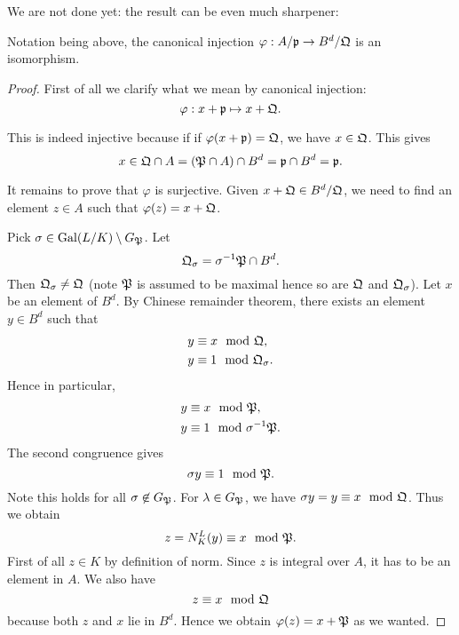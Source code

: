 				We are not done yet: the result can be even much sharpener:
				
				\begin{theorem}
					Notation being above, the canonical injection $\varphi:A/\mathfrak{p} \to B^d/\mathfrak{Q}$ is an isomorphism.
				\end{theorem}
				
				\begin{proof}
					First of all we clarify what we mean by canonical injection:
					\[
						\varphi:x + \mathfrak{p} \mapsto x + \mathfrak{Q}.
					\]
					
					This is indeed injective because if if $\varphi(x+\mathfrak{p})=\mathfrak{Q}$, we have $x \in \mathfrak{Q}$. This gives
					\[
						x \in \mathfrak{Q} \cap A = (\mathfrak{P} \cap A) \cap B^d = \mathfrak{p} \cap B^d = \mathfrak{p}.
					\]
					
					It remains to prove that $\varphi$ is surjective. Given $x + \mathfrak{Q} \in B^d/\mathfrak{Q}$, we need to find an element $z \in A$ such that $\varphi(z) = x + \mathfrak{Q}$. 
					
					Pick $\sigma \in \operatorname{Gal}(L/K) \setminus G_\mathfrak{P}$. Let
					\[
						\mathfrak{Q}_\sigma = \sigma^{-1}\mathfrak{P} \cap B^d.
					\]
					Then $\mathfrak{Q}_\sigma \ne \mathfrak{Q}$ (note $\mathfrak{P}$ is assumed to be maximal hence so are $\mathfrak{Q}$ and $\mathfrak{Q}_\sigma$). Let $x$ be an element of $B^d$. By Chinese remainder theorem, there exists an element $y \in B^d$ such that
					\[
						\begin{aligned}
							y &\equiv x \mod {\mathfrak}{Q}, \\
							y &\equiv 1 \mod {\mathfrak}{Q}_\sigma.
						\end{aligned}
					\]
					Hence in particular,
					\[
						\begin{aligned}
							y &\equiv x \mod {\mathfrak}{P}, \\
							y &\equiv 1 \mod \sigma^{-1}\mathfrak{P}.
						\end{aligned}
					\]
					The second congruence gives
					\[
						\sigma{y} \equiv 1 \mod {\mathfrak}{P}.
					\]
					Note this holds for all $\sigma \not \in G_\mathfrak{P}$. For $\lambda \in G_\mathfrak{P}$, we have $\sigma{y}=y \equiv x \mod {\mathfrak}{Q}$. Thus we obtain
					\[
						z=N_K^L(y) \equiv x \mod {\mathfrak}{P}.
					\]
					First of all $z \in K$ by definition of norm. Since $z$ is integral over $A$, it has to be an element in $A$. We also have %
					\[
						z \equiv x \mod {\mathfrak}{Q}
					\]
					because both $z$ and $x$ lie in $B^d$. Hence we obtain $\varphi(z) = x + \mathfrak{P}$ as we wanted.
				\end{proof}
				
